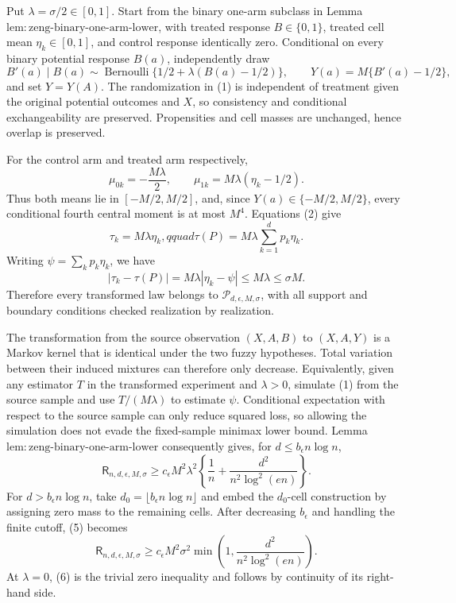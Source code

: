Put \(\lambda=\sigma/2\in[0,1]\).  Start from the binary one-arm subclass in Lemma~\(\mathrm{lem:zeng\text{-}binary\text{-}one\text{-}arm\text{-}lower}\), with treated response \(B\in\{0,1\}\), treated cell mean \(\eta_k\in[0,1]\), and control response identically zero.  Conditional on every binary potential response \(B(a)\), independently draw
\[
 B'(a)\mid B(a)\sim\operatorname{Bernoulli}\{1/2+\lambda(B(a)-1/2)\},
 \qquad Y(a)=M\{B'(a)-1/2\},
\tag{1}
\]
and set \(Y=Y(A)\).  The randomization in (1) is independent of treatment given the original potential outcomes and \(X\), so consistency and conditional exchangeability are preserved.  Propensities and cell masses are unchanged, hence overlap is preserved.

For the control arm and treated arm respectively,
\[
 \mu_{0k}=-\frac{M\lambda}{2},\qquad
 \mu_{1k}=M\lambda(\eta_k-1/2).
\tag{2}
\]
Thus both means lie in \([-M/2,M/2]\), and, since \(Y(a)\in\{-M/2,M/2\}\), every conditional fourth central moment is at most \(M^4\).  Equations (2) give
\[
 \tau_k=M\lambda\eta_k,qquad
 \tau(P)=M\lambda\sum_{k=1}^dp_k\eta_k.
\tag{3}
\]
Writing \(\psi=\sum_kp_k\eta_k\), we have
\[
 |\tau_k-\tau(P)|=M\lambda|\eta_k-\psi|\le M\lambda\le\sigma M.
\tag{4}
\]
Therefore every transformed law belongs to \(\mathcal P_{d,\epsilon,M,\sigma}\), with all support and boundary conditions checked realization by realization.

The transformation from the source observation \((X,A,B)\) to \((X,A,Y)\) is a Markov kernel that is identical under the two fuzzy hypotheses.  Total variation between their induced mixtures can therefore only decrease.  Equivalently, given any estimator \(T\) in the transformed experiment and \(\lambda>0\), simulate (1) from the source sample and use \(T/(M\lambda)\) to estimate \(\psi\).  Conditional expectation with respect to the source sample can only reduce squared loss, so allowing the simulation does not evade the fixed-sample minimax lower bound.  Lemma~\(\mathrm{lem:zeng\text{-}binary\text{-}one\text{-}arm\text{-}lower}\) consequently gives, for \(d\le b_{\epsilon}n\log n\),
\[
 \mathsf R_{n,d,\epsilon,M,\sigma}
 \ge c_{\epsilon}M^2\lambda^2\left\{\frac1n+\frac{d^2}{n^2\log^2(en)}\right\}.
\tag{5}
\]
For \(d>b_{\epsilon}n\log n\), take \(d_0=\lfloor b_{\epsilon}n\log n\rfloor\) and embed the \(d_0\)-cell construction by assigning zero mass to the remaining cells.  After decreasing \(b_{\epsilon}\) and handling the finite cutoff, (5) becomes
\[
 \mathsf R_{n,d,\epsilon,M,\sigma}
 \ge c_{\epsilon}M^2\sigma^2
 \min\left(1,\frac{d^2}{n^2\log^2(en)}\right).
\tag{6}
\]
At \(\lambda=0\), (6) is the trivial zero inequality and follows by continuity of its right-hand side.

